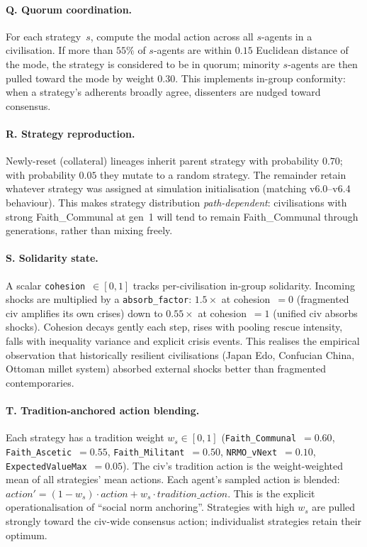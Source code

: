 \paragraph{Q. Quorum coordination.}
For each strategy~$s$, compute the modal action across all
$s$-agents in a civilisation. If more than $55\%$ of $s$-agents are
within $0.15$ Euclidean distance of the mode, the strategy is
considered to be in quorum; minority $s$-agents are then pulled
toward the mode by weight $0.30$. This implements in-group
conformity: when a strategy's adherents broadly agree, dissenters
are nudged toward consensus.

\paragraph{R. Strategy reproduction.}
Newly-reset (collateral) lineages inherit parent strategy with
probability $0.70$; with probability $0.05$ they mutate to a
random strategy. The remainder retain whatever strategy was assigned
at simulation initialisation (matching v6.0--v6.4 behaviour). This
makes strategy distribution \emph{path-dependent}: civilisations
with strong Faith\_Communal at gen~1 will tend to remain Faith\_Communal
through generations, rather than mixing freely.

\paragraph{S. Solidarity state.}
A scalar \texttt{cohesion}~$\in [0, 1]$ tracks per-civilisation
in-group solidarity. Incoming shocks are multiplied by a
\texttt{absorb\_factor}: $1.5\times$ at cohesion~$=0$ (fragmented
civ amplifies its own crises) down to $0.55\times$ at cohesion~$=1$
(unified civ absorbs shocks). Cohesion decays gently each step,
rises with pooling rescue intensity, falls with inequality variance
and explicit crisis events. This realises the empirical observation
that historically resilient civilisations (Japan Edo, Confucian
China, Ottoman millet system) absorbed external shocks better than
fragmented contemporaries.

\paragraph{T. Tradition-anchored action blending.}
Each strategy has a tradition weight $w_s \in [0, 1]$
(\texttt{Faith\_Communal}~$=0.60$, \texttt{Faith\_Ascetic}~$=0.55$,
\texttt{Faith\_Militant}~$=0.50$, \texttt{NRMO\_vNext}~$=0.10$,
\texttt{ExpectedValueMax}~$=0.05$). The civ's tradition action is
the weight-weighted mean of all strategies' mean actions. Each agent's
sampled action is blended:
$\mathit{action}' = (1 - w_s) \cdot \mathit{action} + w_s \cdot
\mathit{tradition\_action}$. This is the explicit operationalisation
of ``social norm anchoring''. Strategies with high $w_s$ are pulled
strongly toward the civ-wide consensus action; individualist
strategies retain their optimum.

